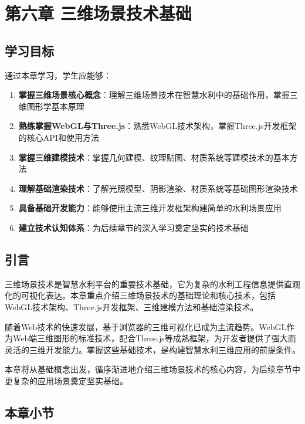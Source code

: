 \section{第六章 三维场景技术基础}\label{ux7b2cux516dux7ae0-ux4e09ux7ef4ux573aux666fux6280ux672fux57faux7840}

\subsection{学习目标}\label{ux5b66ux4e60ux76eeux6807}

通过本章学习，学生应能够：

\begin{enumerate}
\def\labelenumi{\arabic{enumi}.}
\tightlist
\item
  \textbf{掌握三维场景核心概念}：理解三维场景技术在智慧水利中的基础作用，掌握三维图形学基本原理
\item
  \textbf{熟练掌握WebGL与Three.js}：熟悉WebGL技术架构，掌握Three.js开发框架的核心API和使用方法
\item
  \textbf{掌握三维建模技术}：掌握几何建模、纹理贴图、材质系统等建模技术的基本方法
\item
  \textbf{理解基础渲染技术}：了解光照模型、阴影渲染、材质系统等基础图形渲染技术
\item
  \textbf{具备基础开发能力}：能够使用主流三维开发框架构建简单的水利场景应用
\item
  \textbf{建立技术认知体系}：为后续章节的深入学习奠定坚实的技术基础
\end{enumerate}

\subsection{引言}\label{ux5f15ux8a00}

三维场景技术是智慧水利平台的重要技术基础，它为复杂的水利工程信息提供直观化的可视化表达。本章重点介绍三维场景技术的基础理论和核心技术，包括WebGL技术架构、Three.js开发框架、三维建模方法和基础渲染技术。

随着Web技术的快速发展，基于浏览器的三维可视化已成为主流趋势。WebGL作为Web端三维图形的标准技术，配合Three.js等成熟框架，为开发者提供了强大而灵活的三维开发能力。掌握这些基础技术，是构建智慧水利三维应用的前提条件。

本章将从基础概念出发，循序渐进地介绍三维场景技术的核心内容，为后续章节中更复杂的应用场景奠定坚实基础。

\subsection{本章小节}\label{ux672cux7ae0ux5c0fux8282}

